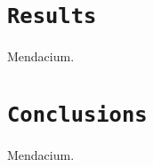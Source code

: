\documentclass[12pt,a4paper,twocolumn]{article}
\begin{document}
\section*{\texttt{Results}}
Mendacium.


\section*{\texttt{Conclusions}}
Mendacium.






\end{document}
